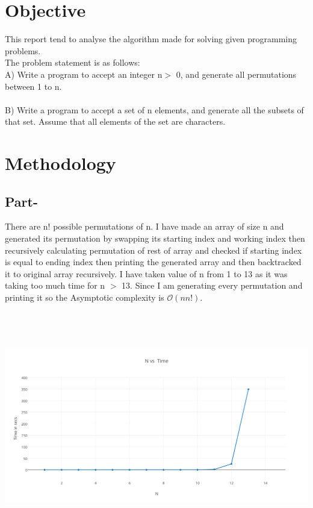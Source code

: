 \documentclass[12pt, a4paper]{article}
\begin{document}
\pagestyle{plain}
\def\title{CS 403: Algorithm Design and Analysis }
\def\who{\LARGE IIT Mandi}
\def\guide{}

\titlpage
\tableofcontents



\newpage
{}


\section{Objective}
This report tend to analyse the algorithm made for solving given programming problems.\\
The problem statement is as follows: \\A) Write a program to accept an integer n$>$ 0, and generate all permutations between 1 to n.\\
\\B) Write a program to accept a set of n elements, and generate all the subsets of that set. Assume that all elements of the set are characters.\\
\section{Methodology}
\subsection{Part-}
There are n! possible permutations of n. I have made an array of size n and generated its permutation by swapping its starting index and working index then recursively calculating permutation of rest of array and checked if starting index is equal to ending index then printing the generated array and then backtracked it to original array recursively. I have taken value of n from 1 to 13 as it was taking too much time for n $>$ 13. Since I am generating every permutation and printing it so the Asymptotic complexity is $\mathcal{O}(nn!)$.
\begin{center}
 \includegraphics[height = 10cm, width = 16cm]{PartA.png}
\end{center}
\end{document}
